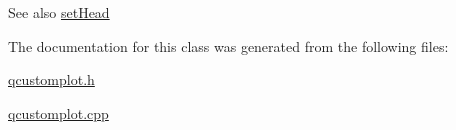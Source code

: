 \begin{DoxySeeAlso}{See also}
\hyperlink{classQCPItemCurve_a08a30d9cdd63995deea3d9e20430676f}{set\+Head} 
\end{DoxySeeAlso}


The documentation for this class was generated from the following files\+:\begin{DoxyCompactItemize}
\item 
\hyperlink{qcustomplot_8h}{qcustomplot.\+h}\item 
\hyperlink{qcustomplot_8cpp}{qcustomplot.\+cpp}\end{DoxyCompactItemize}
